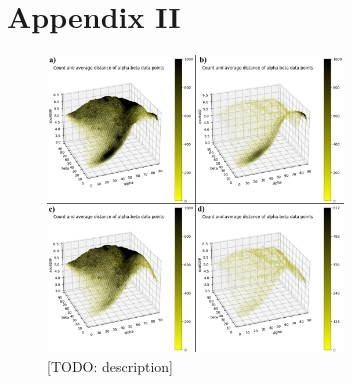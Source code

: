 \chapter*{Appendix II}

\begin{figure}[H]
  \centering
  \includegraphics[width=0.7\textwidth]{figures/appendix/stacking_sampling.png}
  \caption{\label{fig:appendix/stacking_sampling} [TODO: description]}
\end{figure}



